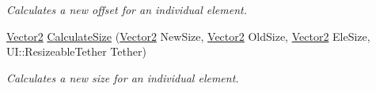 \begin{DoxyCompactItemize}
\begin{DoxyCompactList}\small\item\em Calculates a new offset for an individual element. \item\end{DoxyCompactList}\item 
\hypertarget{classphys_1_1UI_1_1Window_a69e6f07894c09a56edab7d78d05b139f}{
\hyperlink{classphys_1_1Vector2}{Vector2} \hyperlink{classphys_1_1UI_1_1Window_a69e6f07894c09a56edab7d78d05b139f}{CalculateSize} (\hyperlink{classphys_1_1Vector2}{Vector2} NewSize, \hyperlink{classphys_1_1Vector2}{Vector2} OldSize, \hyperlink{classphys_1_1Vector2}{Vector2} EleSize, UI::ResizeableTether Tether)}
\label{d4/d86/classphys_1_1UI_1_1Window_a69e6f07894c09a56edab7d78d05b139f}

\begin{DoxyCompactList}\small\item\em Calculates a new size for an individual element. \item\end{DoxyCompactList}\end{DoxyCompactItemize}
